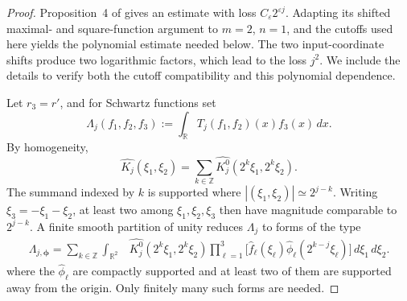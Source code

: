 \documentclass[11pt]{amsart}
\theoremstyle{remark}
\numberwithin{equation}{section}
\newcommand{\R}{\mathbb R}
\begin{document}
	\begin{proof}
		Proposition~4 of \cite{dosidis_multilinear_2024} gives an estimate with loss
		\(C_\varepsilon2^{\varepsilon j}\).  Adapting its shifted maximal- and
		square-function argument to \(m=2\), \(n=1\), and the cutoffs used here yields
		the polynomial estimate needed below.  The two input-coordinate shifts
		produce two logarithmic factors, which lead to the loss \(j^2\).  We include
		the details to verify both the cutoff compatibility and this polynomial
		dependence.
		
		Let \(r_3=r'\), and for Schwartz functions set
		\[
		\Lambda_j(f_1,f_2,f_3)
		:=\int_\R T_j(f_1,f_2)(x)f_3(x)\,dx.
		\]
		By homogeneity,
		\[
		\widehat{K_j}(\xi_1,\xi_2)
		=\sum_{k\in\mathbb Z}
		\widehat{K_j^0}(2^k\xi_1,2^k\xi_2).
		\]
		The summand indexed by \(k\) is supported where
		\(|(\xi_1,\xi_2)|\simeq2^{j-k}\). Writing
		\(\xi_3=-\xi_1-\xi_2\), at least two among
		\(\xi_1,\xi_2,\xi_3\) then have magnitude comparable to
		\(2^{j-k}\). A finite smooth partition of unity reduces
		\(\Lambda_j\) to forms of the type
		\[
		\begin{aligned}
			\Lambda_{j,\boldsymbol\phi}
			=\sum_{k\in\mathbb Z}\int_{\R^2}
			&\widehat{K_j^0}(2^k\xi_1,2^k\xi_2)
			\prod_{\ell=1}^3
			\bigl[
			\widehat f_\ell(\xi_\ell)
			\widehat\phi_\ell(2^{k-j}\xi_\ell)
			\bigr] \,d\xi_1\,d\xi_2.
		\end{aligned}
		\]
		where the \(\widehat\phi_\ell\) are compactly supported and at least two
		of them are supported away from the origin. Only finitely many such forms
		are needed.
		

\end{proof}
\end{document}
